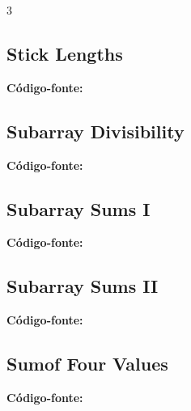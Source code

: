 \documentclass[8pt]{extarticle}
\begin{document}
\begin{multicols*}{3}
\subsection{Stick Lengths}
\begin{caixaenunciado}

\end{caixaenunciado}
\vspace{0.3cm}
\noindent\textbf{Código-fonte:}


\subsection{Subarray Divisibility}
\begin{caixaenunciado}

\end{caixaenunciado}
\vspace{0.3cm}
\noindent\textbf{Código-fonte:}


\subsection{Subarray Sums I}
\begin{caixaenunciado}

\end{caixaenunciado}
\vspace{0.3cm}
\noindent\textbf{Código-fonte:}


\subsection{Subarray Sums II}
\begin{caixaenunciado}

\end{caixaenunciado}
\vspace{0.3cm}
\noindent\textbf{Código-fonte:}


\subsection{Sumof Four Values}
\begin{caixaenunciado}

\end{caixaenunciado}
\vspace{0.3cm}
\noindent\textbf{Código-fonte:}



\end{multicols*}
\end{document}
